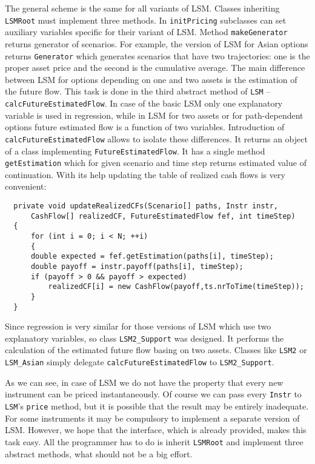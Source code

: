 \documentclass[a4paper,11pt, twoside]{book}
\theoremstyle{definition}
\theoremstyle{remark}
\begin{document}
The general scheme is the same for all variants of LSM. Classes inheriting \texttt{LSMRoot} must implement three methods. In \texttt{initPricing} subclasses can set auxiliary variables specific for their variant of LSM. Method \texttt{makeGenerator} returns generator of scenarios. For example, the version of LSM for Asian options returns \texttt{Generator} which generates scenarios that have two trajectories: one is the proper asset price and the second is the cumulative average. The main difference between LSM for options depending on one and two assets is the estimation of the future flow. This task is done in the third abstract method of \texttt{LSM} -- \texttt{calcFutureEstimatedFlow}. In case of the basic LSM only one explanatory variable is used in regression, while in LSM for two assets or for path-dependent options future estimated flow is a function of two variables. Introduction of \texttt{calcFutureEstimatedFlow} allows to isolate these differences. It returns an object of a class implementing \texttt{FutureEstimatedFlow}. It has a single method \texttt{getEstimation} which for given scenario and time step returns estimated value of continuation. With its help updating the table of realized cash flows is very convenient:

\begin{lstlisting}
  private void updateRealizedCFs(Scenario[] paths, Instr instr,
      CashFlow[] realizedCF, FutureEstimatedFlow fef, int timeStep)
  {
      for (int i = 0; i < N; ++i)
      {
	  double expected = fef.getEstimation(paths[i], timeStep);
	  double payoff = instr.payoff(paths[i], timeStep);
	  if (payoff > 0 && payoff > expected)
	      realizedCF[i] = new CashFlow(payoff,ts.nrToTime(timeStep));
      }
  }
\end{lstlisting}
   
Since regression is very similar for those versions of LSM which use two explanatory variables, so class \texttt{LSM2\_Support} was designed. It performs the calculation of the estimated future flow basing on two assets. Classes like \texttt{LSM2} or \texttt{LSM\_Asian} simply delegate \texttt{calcFutureEstimatedFlow} to \texttt{LSM2\_Support}.
   
As we can see, in case of LSM we do not have the property that every new instrument can be priced instantaneously. Of course we can pass every \texttt{Instr} to \texttt{LSM}'s \texttt{price} method, but it is possible that the result may be entirely inadequate. For some instruments it may be compulsory to implement a separate version of LSM. However, we hope that the interface, which is already provided, makes this task easy. All the programmer has to do is inherit \texttt{LSMRoot} and implement three abstract methods, what should not be a big effort.
\end{document}
